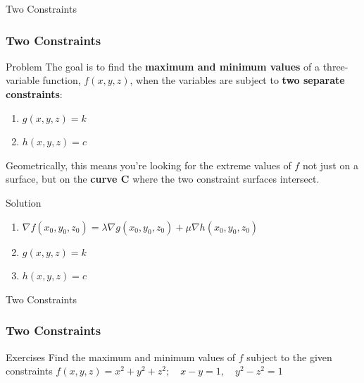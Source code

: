\documentclass[aspectratio=169, UTF8]{beamer}
\begin{document}
\begin{frame}{Two Constraints}
    \frametitle{Two Constraints}
    \begin{block}{Problem}
        The goal is to find the \textbf{maximum and minimum values} of a three-variable function, $f(x, y, z)$, when the variables are subject to \textbf{two separate constraints}:

\begin{enumerate}
    \item $g(x, y, z) = k$
    \item $h(x, y, z) = c$
\end{enumerate}

Geometrically, this means you're looking for the extreme values of $f$ not just on a surface, but on the \textbf{curve C} where the two constraint surfaces intersect.
    \end{block}
    \begin{block}{Solution}
        \begin{enumerate}
            \item $\nabla f(x_0, y_0, z_0) = \lambda \nabla g(x_0, y_0, z_0) + \mu \nabla h(x_0, y_0, z_0)$
            \item $g(x, y, z) = k$
            \item $h(x, y, z) = c$
        \end{enumerate}
    \end{block}
\end{frame}
\begin{frame}{Two Constraints}
    \frametitle{Two Constraints}
    \begin{block}{Exercises}
        Find the maximum and minimum values of $f$ subject to the given constraints
        $f(x, y, z) = x^2 + y^2 + z^2; \quad x - y = 1, \quad y^2 - z^2 = 1$
    \end{block}
\end{frame}
\end{document}
